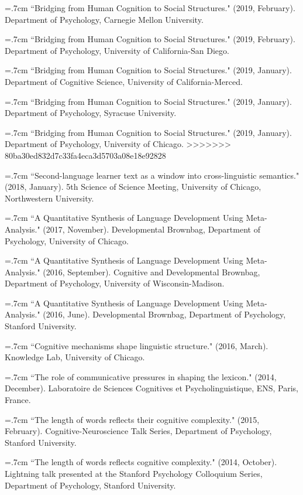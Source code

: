 \documentclass[letterpaper]{article}
\begin{document}
\hangindent=.7cm ``Bridging from Human Cognition to Social Structures." (2019, February). Department of Psychology, Carnegie Mellon University.

\hangindent=.7cm ``Bridging from Human Cognition to Social Structures." (2019, February). Department of Psychology, University of California-San Diego.

\hangindent=.7cm ``Bridging from Human Cognition to Social Structures." (2019, January). Department of Cognitive Science, University of California-Merced.

\hangindent=.7cm ``Bridging from Human Cognition to Social Structures." (2019, January). Department of Psychology, Syracuse University.

\hangindent=.7cm ``Bridging from Human Cognition to Social Structures." (2019, January). Department of Psychology, University of Chicago.
>>>>>>> 80ba30ed832d7c33fa4eca3d5703a08e18e92828

\hangindent=.7cm ``Second-language learner text as a window into cross-linguistic semantics." (2018, January). 5th Science of Science Meeting,  University of Chicago, Northwestern University.

\hangindent=.7cm ``A Quantitative Synthesis of Language Development Using Meta-Analysis." (2017, November). Developmental Brownbag, Department of Psychology,  University of Chicago.

\hangindent=.7cm ``A Quantitative Synthesis of Language Development Using Meta-Analysis." (2016, September). Cognitive and Developmental Brownbag, Department of Psychology,  University of Wisconsin-Madison.

\hangindent=.7cm ``A Quantitative Synthesis of Language Development Using Meta-Analysis." (2016, June). Developmental Brownbag, Department of Psychology,  Stanford University.

\hangindent=.7cm  ``Cognitive mechanisms shape linguistic structure."  (2016, March).  Knowledge Lab, University of Chicago.

\hangindent=.7cm ``The role of communicative pressures in shaping the lexicon." (2014, December). Laboratoire de Sciences Cognitives et Psycholinguistique, ENS, Paris, France.

\hangindent=.7cm ``The length of words reflects their cognitive complexity." (2015, February). Cognitive-Neuroscience Talk Series, Department of Psychology, Stanford University.

\hangindent=.7cm ``The length of words reflects cognitive complexity." (2014, October). Lightning talk presented at the Stanford Psychology Colloquium Series, Department of Psychology, Stanford University.
\end{document}
